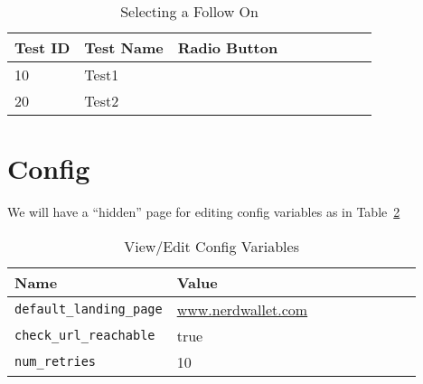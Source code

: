 \documentclass[letterpaper]{article}
\begin{document}
\begin{table}[hb]
\centering
\begin{tabular}{|l||l|l|l|l|l|l|l|l|}  \hline \hline
  {\bf Test ID } & {\bf Test Name} & {\bf Radio Button}\\ \hline 
  10 & Test1 & \\ \hline
  20 & Test2 & \\ \hline
\hline
\end{tabular}
\caption{Selecting a Follow On}
\label{tbl_follow_on}
\end{table}

\section{Config}
We will have a ``hidden'' page for editing config variables as in
Table~\ref{tbl_config}

\begin{table}[hb]
\centering
\begin{tabular}{|l||l|l|l|l|l|l|l|l|}  \hline \hline
  {\bf Name } & {\bf Value} \\ \hline \hline
  \verb+default_landing_page+ & \url{www.nerdwallet.com} \\ \hline
\verb+check_url_reachable+ & true \\ \hline
  \verb+num_retries+ & 10 \\ \hline 
\hline
\end{tabular}
\caption{View/Edit Config Variables}
\label{tbl_config}
\end{table}
\end{document}

